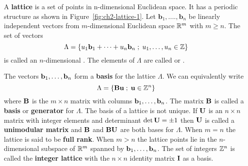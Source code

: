 
A \textbf{lattice} is a set of points in n-dimensional Euclidean space. It has a periodic structure as shown in Figure~\ref{fig:ch2-lattice-1}. Let $\mathbf{b}_1,....,\mathbf{b}_n$ be linearly independent vectors from $m$-dimensional Euclidean space ${\mathbb R}^m$ with $m\geq n$.  The set of vectors
\[
\Lambda = \{ u_1\mathbf{b}_1 + \dots + u_n \mathbf{b}_n \; ; \; u_1,\dots,u_n \in {\mathbb Z} \}
\]
is called an $n$-dimensional .  The elements of $\Lambda$ are called  or . 

The vectors $\mathbf{b}_1,\dots,\mathbf{b}_n$ form a \textbf{basis} for the lattice $\Lambda$.  We can equivalently write
\[
\Lambda=\{ \mathbf{B}\mathbf{u} \; ; \; \mathbf{u} \in {\mathbb Z}^n \}
\]
where $\mathbf{B}$ is the $m\times n$ matrix with columns $\mathbf{b}_1,\dots,\mathbf{b}_n$. The matrix $\mathbf{B}$ is called a \textbf{basis} or \textbf{generator} for $\Lambda$. The basis of a lattice is not unique. If $\mathbf{U}$ is an $n \times n$ matrix with integer elements and determinant $\det\mathbf{U}=\pm 1$ then  $\mathbf{U}$ is called a \textbf{unimodular matrix} and $\mathbf{B}$ and $\mathbf{B}\mathbf{U}$ are both bases for $\Lambda$.  When $m = n$ the lattice is said to be \textbf{full rank}. When $m > n$ the lattice points lie in the $n$-dimensional subspace of ${\mathbb R}^m$ spanned by $\mathbf{b}_1,\dots,\mathbf{b}_n$.  The set of integers ${\mathbb Z}^n$ is called the \textbf{integer lattice} with the $n \times n$ identity matrix $\bf{I}$ as a basis.

